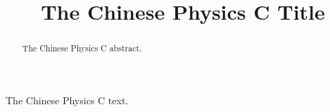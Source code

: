\documentclass[a4paper,10pt,twoside]{cpc-hepnp}
\begin{document}
 \title{The Chinese Physics C Title}



  \begin{abstract}
The Chinese Physics C abstract.
  \end{abstract}


The Chinese Physics C text.
\end{document}

